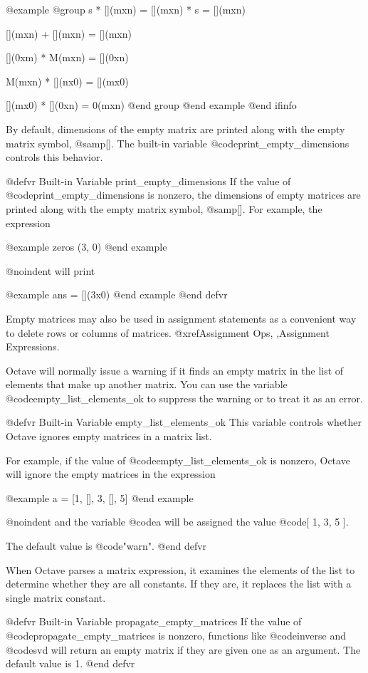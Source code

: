 @example
@group
s * [](mxn) = [](mxn) * s = [](mxn)

    [](mxn) + [](mxn) = [](mxn)

    [](0xm) *  M(mxn) = [](0xn)

     M(mxn) * [](nx0) = [](mx0)

    [](mx0) * [](0xn) =  0(mxn)
@end group
@end example
@end ifinfo

By default, dimensions of the empty matrix are printed along with the
empty matrix symbol, @samp{[]}.  The built-in variable
@code{print_empty_dimensions} controls this behavior.

@defvr {Built-in Variable} print_empty_dimensions
If the value of @code{print_empty_dimensions} is nonzero, the
dimensions of empty matrices are printed along with the empty matrix
symbol, @samp{[]}.  For example, the expression

@example
zeros (3, 0)
@end example

@noindent
will print

@example
ans = [](3x0)
@end example
@end defvr

Empty matrices may also be used in assignment statements as a convenient
way to delete rows or columns of matrices.
@xref{Assignment Ops, ,Assignment Expressions}.

Octave will normally issue a warning if it finds an empty matrix in the
list of elements that make up another matrix.  You can use the variable
@code{empty_list_elements_ok} to suppress the warning or to treat it as
an error.

@defvr {Built-in Variable} empty_list_elements_ok
This variable controls whether Octave ignores empty matrices in a matrix
list.

For example, if the value of @code{empty_list_elements_ok} is
nonzero, Octave will ignore the empty matrices in the expression

@example
a = [1, [], 3, [], 5]
@end example

@noindent
and the variable @code{a} will be assigned the value @code{[ 1, 3, 5 ]}.

The default value is @code{"warn"}.
@end defvr

When Octave parses a matrix expression, it examines the elements of the
list to determine whether they are all constants.  If they are, it
replaces the list with a single matrix constant.

@defvr {Built-in Variable} propagate_empty_matrices
If the value of @code{propagate_empty_matrices} is nonzero,
functions like @code{inverse} and @code{svd} will return an empty matrix
if they are given one as an argument.  The default value is 1.
@end defvr

